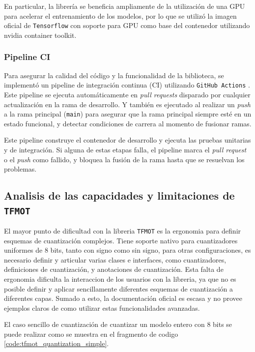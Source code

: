En particular, la librería se beneficia ampliamente de la utilización de una GPU para acelerar el entrenamiento de los modelos, por lo que se utilizó la imagen oficial de \texttt{Tensorflow} con soporte para GPU como base del contenedor utilizando nvidia container toolkit\cite{nvidia_container_toolkit}.

\subsubsection{Pipeline CI}
Para asegurar la calidad del código y la funcionalidad de la biblioteca, se implementó un pipeline de integración continua (CI) utilizando \texttt{GitHub Actions} \cite{github_actions}. Este pipeline se ejecuta automáticamente en \textit{pull requests} disparado por cualquier actualización en la rama de desarrollo. Y también es ejecutado al realizar un \textit{push} a la rama principal (\texttt{main}) para asegurar que la rama principal siempre esté en un estado funcional, y detectar condiciones de carrera al momento de fusionar ramas.

Este pipeline construye el contenedor de desarrollo y ejecuta las pruebas unitarias y de integración. Si alguna de estas etapas falla, el pipeline marca el \textit{pull request} o el \textit{push} como fallido, y bloquea la fusión de la rama hasta que se resuelvan los problemas.

\subsection{Analisis de las capacidades y limitaciones de \texttt{TFMOT}}

El mayor punto de dificultad con la libreria \texttt{TFMOT} es la ergonomia para definir esquemas de cuantización complejos. Tiene soporte nativo para cuantizadores uniformes de 8 bits, tanto con signo como sin signo, para otras configuraciones, es necesario definir y articular varias clases e interfaces, como cuantizadores, definiciones de cuantización, y anotaciones de cuantización. Esta falta de ergonomia dificulta la interaccion de los usuarios con la libreria, ya que no es posible definir y aplicar sencillamente diferentes esquemas de cuantización a diferentes capas. Sumado a esto, la documentación oficial es escasa y no provee ejemplos claros de como utilizar estas funcionalidades avanzadas.

El caso sencillo de cuantización de cuantizar un modelo entero con 8 bits se puede realizar como se muestra en el fragmento de codigo \ref{code:tfmot_quantization_simple}.

